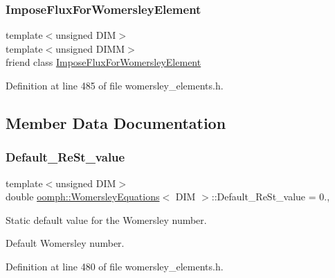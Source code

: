 \subsubsection{\texorpdfstring{Impose\+Flux\+For\+Womersley\+Element}{ImposeFluxForWomersleyElement}}
{\footnotesize\ttfamily template$<$unsigned D\+IM$>$ \\
template$<$unsigned D\+I\+MM$>$ \\
friend class \hyperlink{classoomph_1_1ImposeFluxForWomersleyElement}{Impose\+Flux\+For\+Womersley\+Element}\hspace{0.3cm}{\ttfamily [friend]}}



Definition at line 485 of file womersley\+\_\+elements.\+h.



\subsection{Member Data Documentation}
\mbox{\label{classoomph_1_1WomersleyEquations_a9f25fbad09d6e3b14971755ea81f0189}} 
\subsubsection{\texorpdfstring{Default\+\_\+\+Re\+St\+\_\+value}{Default\_ReSt\_value}}
{\footnotesize\ttfamily template$<$unsigned D\+IM$>$ \\
double \hyperlink{classoomph_1_1WomersleyEquations}{oomph\+::\+Womersley\+Equations}$<$ D\+IM $>$\+::Default\+\_\+\+Re\+St\+\_\+value = 0.\hspace{0.3cm}{\ttfamily [static]}, {\ttfamily [protected]}}



Static default value for the Womersley number. 

Default Womersley number. 

Definition at line 480 of file womersley\+\_\+elements.\+h.

\mbox{\label{classoomph_1_1WomersleyEquations_acf9f462d481937ec282ccb48c34e77bc}} 
